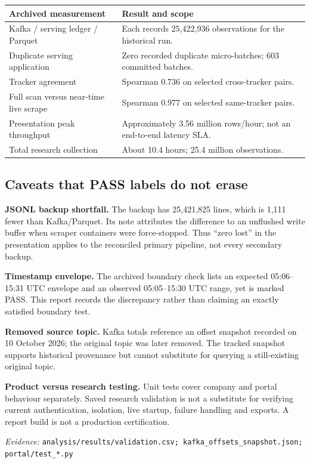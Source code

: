 \documentclass[11pt,a4paper]{article}
\newcommand{\code}[1]{{\small\nolinkurl{#1}}}
\newcommand{\source}[1]{{\footnotesize\textit{Evidence:} \code{#1}\par}}
\begin{document}
\begin{tabularx}{\linewidth}{@{}YY@{}}
\toprule
\textbf{Archived measurement} & \textbf{Result and scope}\\
\midrule
Kafka / serving ledger / Parquet & Each records 25,422,936 observations for the historical run.\\
Duplicate serving application & Zero recorded duplicate micro-batches; 603 committed batches.\\
Tracker agreement & Spearman 0.736 on selected cross-tracker pairs.\\
Full scan versus near-time live scrape & Spearman 0.977 on selected same-tracker pairs.\\
Presentation peak throughput & Approximately 3.56 million rows/hour; not an end-to-end latency SLA.\\
Total research collection & About 10.4 hours; 25.4 million observations.\\
\bottomrule
\end{tabularx}

\subsection{Caveats that PASS labels do not erase}
\textbf{JSONL backup shortfall.} The backup has 25,421,825 lines, which is
1,111 fewer than Kafka/Parquet. Its note attributes the difference to an
unflushed write buffer when scraper containers were force-stopped.
Thus ``zero lost'' in the presentation applies to the reconciled primary
pipeline, not every secondary backup.

\textbf{Timestamp envelope.} The archived boundary check lists an expected
05:06--15:31 UTC envelope and an observed 05:05--15:30 UTC range, yet is
marked PASS. This report records the discrepancy rather than claiming an
exactly satisfied boundary test.

\textbf{Removed source topic.} Kafka totals reference an offset snapshot
recorded on 10 October 2026; the original topic was later removed.
The tracked snapshot supports historical provenance but cannot substitute
for querying a still-existing original topic.

\textbf{Product versus research testing.} Unit tests cover company and
portal behaviour separately. Saved research validation is not a substitute
for verifying current authentication, isolation, live startup, failure
handling and exports. A report build is not a production certification.

\source{analysis/results/validation.csv; kafka_offsets_snapshot.json; portal/test_*.py}
\end{document}

